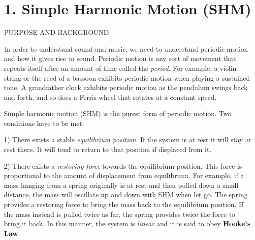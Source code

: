 \documentclass[11pt]{NSF}
\begin{document}
     
\section{1. Simple Harmonic Motion (SHM)}

PURPOSE AND BACKGROUND

In order to understand sound and music, we need to understand periodic motion
and how it gives rise to sound. Periodic motion is any sort of movement that
repeats itself after an amount of time called the {\em period}. 
For example, a violin
string or the reed of a bassoon exhibits periodic motion when playing a
sustained tone. A grandfather clock exhibits periodic motion as the pendulum
swings back and forth, and so does a Ferris wheel that rotates at a constant
speed.

Simple harmonic motion (SHM) is the purest form of periodic motion. Two
conditions have to be met:

1) There exists a stable {\em equilibrium position}. 
If the system is at rest it will
stay at rest there. It will tend to return to that position if displaced from
it.

2) There exists a {\em restoring force} towards the equilibrium position. 
This force
is proportional to the amount of displacement from equilibrium. For example, if
a mass hanging from a spring originally is at rest and then pulled down a small
distance, the mass will oscillate up and down with SHM when let go. The spring
provides a restoring force to bring the mass back to the equilibrium position.
If the mass instead is pulled twice as far, the spring provides twice the force
to bring it back. In this manner, the system is {\em linear} 
and it is said to obey {\bf Hooke’s Law}.
\end{document}
